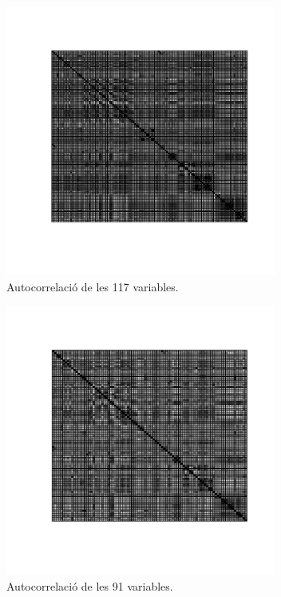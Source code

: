 \documentclass[a4paper,10pt]{article}
\begin{document}
\begin{figure}
\centering
\includegraphics[width = 3.5in]{memoria-autoc}
\caption{Autocorrelació de les 117 variables.} \label{fig:autoc}
\end{figure}



\begin{figure}
\centering
\includegraphics[width = 3.5in]{memoria-autoc_clean}
\caption{Autocorrelació de les 91
variables.} \label{fig:autoc_clean}
\end{figure}



\end{document}
